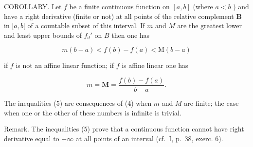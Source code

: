 COROLLARY. Let \(f\) be a finite continuous function on \([a, b]\) (where \(a < b\) ) and have a right derivative (finite or not) at all points of the relative complement \(\mathbf{B}\) in \([a, b[\) of a countable subset of this interval. If \(m\) and \(M\) are the greatest lower and least upper bounds of \(f_d'\) on \(B\) then one has

\[
m (b - a) <   f (b) - f (a) <   \mathrm{M} (b - a)\tag{5}
\]

if \(f\) is not an affine linear function; if \(f\) is affine linear one has

\[
m = \mathbf {M} = \frac {f (b) - f (a)}{b - a}.
\]

The inequalities (5) are consequences of (4) when \(m\) and \(M\) are finite; the case when one or the other of these numbers is infinite is trivial.

Remark. The inequalities (5) prove that a continuous function cannot have right derivative equal to \(+\infty\) at all points of an interval (cf.~I, p.~38, exerc. 6).

